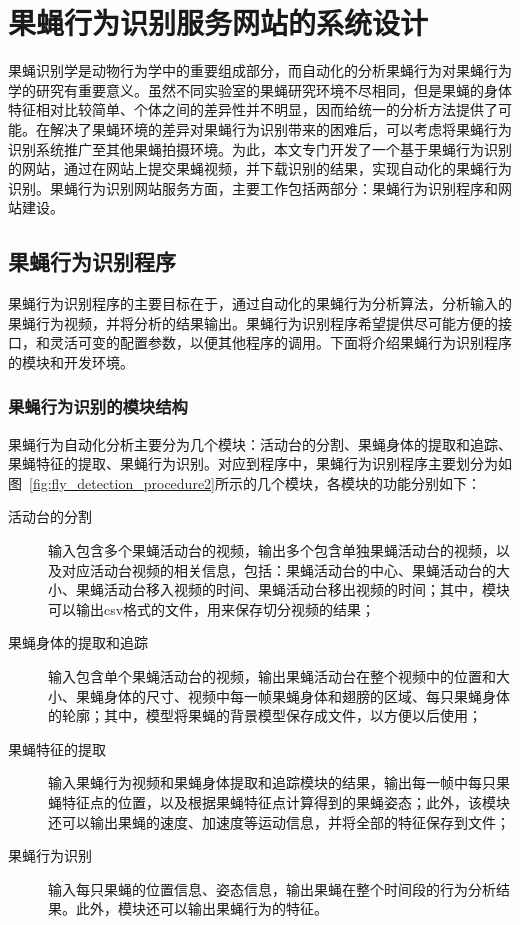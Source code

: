 \chapter{果蝇行为识别服务网站的系统设计}

果蝇识别学是动物行为学中的重要组成部分，而自动化的分析果蝇行为对果蝇行为学的研究有重要意义。虽然不同实验室的果蝇研究环境不尽相同，但是果蝇的身体特征相对比较简单、个体之间的差异性并不明显，因而给统一的分析方法提供了可能。在解决了果蝇环境的差异对果蝇行为识别带来的困难后，可以考虑将果蝇行为识别系统推广至其他果蝇拍摄环境。为此，本文专门开发了一个基于果蝇行为识别的网站，通过在网站上提交果蝇视频，并下载识别的结果，实现自动化的果蝇行为识别。果蝇行为识别网站服务方面，主要工作包括两部分：果蝇行为识别程序和网站建设。

\section{果蝇行为识别程序}

果蝇行为识别程序的主要目标在于，通过自动化的果蝇行为分析算法，分析输入的果蝇行为视频，并将分析的结果输出。果蝇行为识别程序希望提供尽可能方便的接口，和灵活可变的配置参数，以便其他程序的调用。下面将介绍果蝇行为识别程序的模块和开发环境。

\subsection{果蝇行为识别的模块结构}

果蝇行为自动化分析主要分为几个模块：活动台的分割、果蝇身体的提取和追踪、果蝇特征的提取、果蝇行为识别。对应到程序中，果蝇行为识别程序主要划分为如图~\ref{fig:fly_detection_procedure2}所示的几个模块，各模块的功能分别如下：
\begin{description}
\item[活动台的分割] 输入包含多个果蝇活动台的视频，输出多个包含单独果蝇活动台的视频，以及对应活动台视频的相关信息，包括：果蝇活动台的中心、果蝇活动台的大小、果蝇活动台移入视频的时间、果蝇活动台移出视频的时间；其中，模块可以输出csv格式的文件，用来保存切分视频的结果；
\item[果蝇身体的提取和追踪] 输入包含单个果蝇活动台的视频，输出果蝇活动台在整个视频中的位置和大小、果蝇身体的尺寸、视频中每一帧果蝇身体和翅膀的区域、每只果蝇身体的轮廓；其中，模型将果蝇的背景模型保存成文件，以方便以后使用；
\item[果蝇特征的提取] 输入果蝇行为视频和果蝇身体提取和追踪模块的结果，输出每一帧中每只果蝇特征点的位置，以及根据果蝇特征点计算得到的果蝇姿态；此外，该模块还可以输出果蝇的速度、加速度等运动信息，并将全部的特征保存到文件；
\item[果蝇行为识别] 输入每只果蝇的位置信息、姿态信息，输出果蝇在整个时间段的行为分析结果。此外，模块还可以输出果蝇行为的特征。
\end{description}

